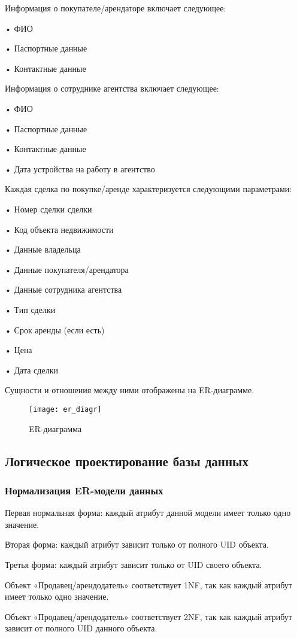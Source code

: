 Информация о покупателе/арендаторе включает следующее:

•	ФИО

•	Паспортные данные

•	Контактные данные

Информация о сотруднике агентства включает следующее:

•	ФИО

•	Паспортные данные

•	Контактные данные

•	Дата устройства на работу в агентство

Каждая сделка по покупке/аренде характеризуется следующими параметрами:

•	Номер сделки сделки

•	Код объекта недвижимости 

•	Данные владельца

•	Данные покупателя/арендатора

•	Данные сотрудника агентства

•	Тип сделки

•	Срок аренды (если есть)

•	Цена 

•	Дата сделки

Сущности и отношения между ними отображены на ER-диаграмме.
\begin{figure}[H]
\texttt{[image: er\_diagr]}
\caption{ER-диаграмма}
\label{ER_diagramma:image}
\end{figure}

\subsection{Логическое проектирование базы данных}

\subsubsection{Нормализация ER-модели данных}

Первая нормальная форма: каждый атрибут данной модели имеет только
одно значение.

Вторая форма: каждый атрибут зависит только от полного UID объекта.

Третья форма: каждый атрибут зависит только от UID своего объекта.

Объект «Продавец/арендодатель» соответствует 1NF, так как каждый атрибут имеет только одно значение.

Объект «Продавец/арендодатель» соответствует 2NF, так как каждый атрибут зависит от полного UID данного объекта.

